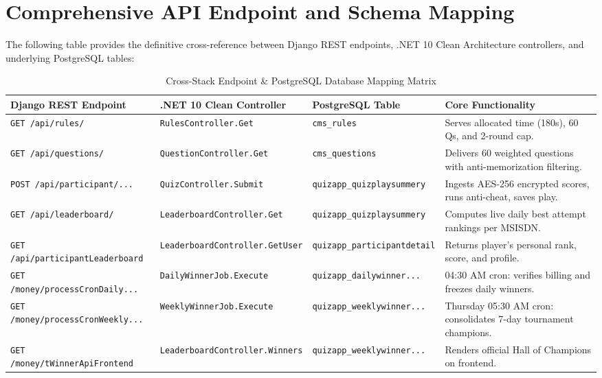 \section{Comprehensive API Endpoint and Schema Mapping}
The following table provides the definitive cross-reference between Django REST endpoints, .NET 10 Clean Architecture controllers, and underlying PostgreSQL tables:

\begin{table}[htbp]
\centering
\scriptsize
\begin{tabular}{|p{3.8cm}|p{3.8cm}|p{3.0cm}|p{3.4cm}|}
\hline
\rowcolor{primaryBlue!15}
\textbf{Django REST Endpoint} & \textbf{.NET 10 Clean Controller} & \textbf{PostgreSQL Table} & \textbf{Core Functionality} \\ \hline
\texttt{GET /api/rules/} & \texttt{RulesController.Get} & \texttt{cms\_rules} & Serves allocated time (180s), 60 Qs, and 2-round cap. \\ \hline
\texttt{GET /api/questions/} & \texttt{QuestionController.Get} & \texttt{cms\_questions} & Delivers 60 weighted questions with anti-memorization filtering. \\ \hline
\texttt{POST /api/participant/...} & \texttt{QuizController.Submit} & \texttt{quizapp\_quizplaysummery} & Ingests AES-256 encrypted scores, runs anti-cheat, saves play. \\ \hline
\texttt{GET /api/leaderboard/} & \texttt{LeaderboardController.Get} & \texttt{quizapp\_quizplaysummery} & Computes live daily best attempt rankings per MSISDN. \\ \hline
\texttt{GET /api/participantLeaderboard} & \texttt{LeaderboardController.GetUser} & \texttt{quizapp\_participantdetail} & Returns player's personal rank, score, and profile. \\ \hline
\texttt{GET /money/processCronDaily...} & \texttt{DailyWinnerJob.Execute} & \texttt{quizapp\_dailywinner...} & 04:30 AM cron: verifies billing and freezes daily winners. \\ \hline
\texttt{GET /money/processCronWeekly...} & \texttt{WeeklyWinnerJob.Execute} & \texttt{quizapp\_weeklywinner...} & Thursday 05:30 AM cron: consolidates 7-day tournament champions. \\ \hline
\texttt{GET /money/tWinnerApiFrontend} & \texttt{LeaderboardController.Winners} & \texttt{quizapp\_weeklywinner...} & Renders official Hall of Champions on frontend. \\ \hline
\end{tabular}
\caption{Cross-Stack Endpoint \& PostgreSQL Database Mapping Matrix}
\end{table}

